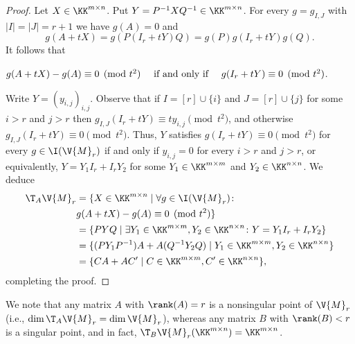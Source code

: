 \begin{proof}
	Let $X \in \KK^{m \times n}$. Put $Y = P^{-1}XQ^{-1} \in \KK^{m \times n}$. 
	For every $g = g_{I,J}$ with $|I|=|J|=r+1$ 
	we have $g(A)=0$ and 
	$$g(A+tX) = g(P(I_r+tY)Q) = g(P)g(I_r+tY)g(Q).$$
	It follows that
	\begin{center}
		$g(A+tX)-g(A) \equiv 0 \pmod{t^2} \linebreak\quad\text{ if and only if }\quad 
		g(I_r+tY) \equiv 0 \pmod{t^2}$.
	\end{center}
	Write $Y=(y_{i,j})_{i,j}$. 
	Observe that if $I=[r]\cup\{i\}$ and $J=[r]\cup\{j\}$ for some $i>r$ and $j>r$ then $g_{I,J}(I_r+tY) \equiv ty_{i,j} \pmod{t^2}$, and otherwise $g_{I,J}(I_r+tY) \equiv 0 \pmod{t^2}$.
	Thus, $Y$ satisfies $g(I_r+tY) \equiv 0 \pmod{t^2}$ for every $g \in \I(\V{M}_r)$ if and only if $y_{i,j}=0$ for every $i>r$ and $j>r$, or equivalently, $Y=Y_1I_r + I_rY_2$ for some $Y_1 \in \KK^{m \times m}$ and $Y_2 \in \KK^{n \times n}$.
	We deduce 
	\begin{align*}
		\T_A\V{M}_r &= \{ X \in \KK^{m \times n} \mid \forall g \in \I(\V{M}_r) \colon\\
		& g(A+tX)-g(A) \equiv 0 \pmod{t^2}\}\\
		&= \{ PYQ \mid \exists Y_1 \in \KK^{m\times m}, Y_2 \in \KK^{n\times n} \colon Y = Y_1I_r + I_r Y_2\}\\
		&= \{ (PY_1P^{-1})A + A(Q^{-1} Y_2 Q) \mid Y_1 \in \KK^{m\times m}, Y_2 \in \KK^{n\times n}\}\\
		&= \{C A + A C' \mid C \in \KK^{m\times m}, C' \in \KK^{n \times n}\},
	\end{align*}
	completing the proof.
\end{proof}

We note that any matrix $A$ with $\rank(A)=r$ is a nonsingular point of $\V{M}_r$ (i.e., $\dim\T_A \V{M}_r = \dim\V{M}_r$), whereas any matrix $B$ with $\rank(B)<r$ is a singular point, and in fact, $\T_B\V{M}_r(\KK^{m \times n}) = \KK^{m \times n}$. 

